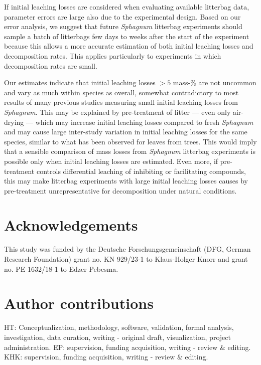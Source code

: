 \documentclass[
  12pt,
]{article}
\begin{document}
If initial leaching losses are considered when evaluating available litterbag data, parameter errors are large also due to the experimental design. Based on our error analysis, we suggest that future \emph{Sphagnum} litterbag experiments should sample a batch of litterbags few days to weeks after the start of the experiment because this allows a more accurate estimation of both initial leaching losses and decomposition rates. This applies particularly to experiments in which decomposition rates are small.

Our estimates indicate that initial leaching losses \(>5\) mass-\% are not uncommon and vary as much within species as overall, somewhat contradictory to most results of many previous studies measuring small initial leaching losses from \emph{Sphagnum}. This may be explained by pre-treatment of litter --- even only air-drying --- which may increase initial leaching losses compared to fresh \emph{Sphagnum} and may cause large inter-study variation in initial leaching losses for the same species, similar to what has been observed for leaves from trees. This would imply that a sensible comparison of mass losses from \emph{Sphagnum} litterbag experiments is possible only when initial leaching losses are estimated. Even more, if pre-treatment controls differential leaching of inhibiting or facilitating compounds, this may make litterbag experiments with large initial leaching losses causes by pre-treatment unrepresentative for decomposition under natural conditions.

\hypertarget{acknowledgements}{%
\section*{Acknowledgements}\label{acknowledgements}}

This study was funded by the Deutsche Forschungsgemeinschaft (DFG, German Research Foundation) grant no. KN 929/23-1 to Klaus-Holger Knorr and grant no. PE 1632/18-1 to Edzer Pebesma.

\hypertarget{author-contributions}{%
\section*{Author contributions}\label{author-contributions}}

HT: Conceptualization, methodology, software, validation, formal analysis, investigation, data curation, writing - original draft, visualization, project administration. EP: supervision, funding acquisition, writing - review \& editing. KHK: supervision, funding acquisition, writing - review \& editing.
\end{document}
